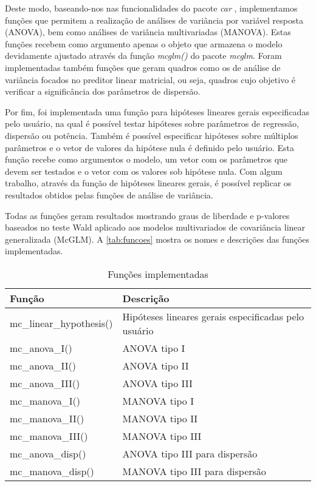 Deste modo, baseando-nos nas funcionalidades do pacote \emph{car} \citep{car}, implementamos funções que permitem a realização de análises de variância por variável resposta (ANOVA), bem como análises de variância multivariadas (MANOVA). Estas funções recebem como argumento apenas o objeto que armazena o modelo devidamente ajustado através da função \emph{mcglm()} do pacote \emph{mcglm}. Foram implementadas também funções que geram quadros como os de análise de variância focados no preditor linear matricial, ou seja, quadros cujo objetivo é verificar a significância dos parâmetros de dispersão. 

Por fim, foi implementada uma função para hipóteses lineares gerais especificadas pelo usuário, na qual é possível testar hipóteses sobre parâmetros de regressão, dispersão ou potência. Também é possível especificar hipóteses sobre múltiplos parâmetros e o vetor de valores da hipótese nula é definido pelo usuário. Esta função recebe como argumentos o modelo, um vetor com os parâmetros que devem ser testados e o vetor com os valores sob hipótese nula. Com algum trabalho, através da função de hipóteses lineares gerais, é possível replicar os resultados obtidos pelas funções de análise de variância.

Todas as funções geram resultados mostrando graus de liberdade e p-valores baseados no teste Wald aplicado aos modelos multivariados de covariância linear generalizada (McGLM). A \autoref{tab:funcoes} mostra os nomes e descrições das funções implementadas.

\begin{table}[h]
\centering
\begin{tabular}{ll}
\hline
Função                   & Descrição \\ 
\hline

mc\_linear\_hypothesis() & Hipóteses lineares gerais especificadas pelo usuário \\

mc\_anova\_I()           & ANOVA  tipo I \\
mc\_anova\_II()          & ANOVA  tipo II \\
mc\_anova\_III()         & ANOVA  tipo III \\

mc\_manova\_I()          & MANOVA tipo I \\
mc\_manova\_II()         & MANOVA tipo II \\
mc\_manova\_III()        & MANOVA tipo III \\

mc\_anova\_disp()        & ANOVA  tipo III para dispersão \\
mc\_manova\_disp()       & MANOVA tipo III para dispersão \\

\hline
\end{tabular}
\caption{Funções implementadas}
\label{tab:funcoes}
\end{table}

